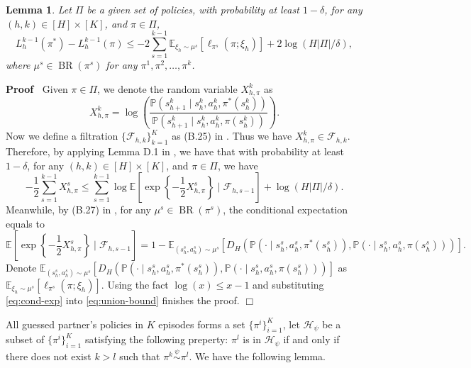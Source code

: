 \documentclass{article}
\newcommand{\tmop}[1]{\ensuremath{\operatorname{#1}}}
\newenvironment{proof}{\noindent\textbf{Proof\ }}{\hspace*{\fill}$\Box$\medskip}
\newtheorem{lemma}{Lemma}
\begin{document}
\begin{lemma}
  \label{lem:loss-upperbound}Let $\Pi$ be a given set of policies, with
  probability at least $1 - \delta$, for any $(h, k) \in [H] \times [K]$, and
  $\pi \in \Pi$,
  \[ L_h^{k - 1} (\pi^{\ast}) - L_h^{k - 1} (\pi) \leq - 2 \sum_{s = 1}^{k -
     1} \mathbb{E}_{\xi_h \sim \mu^s} [\ell_{\pi^s} (\pi ; \xi_h)] + 2 \log (H
     | \Pi | / \delta), \]
  where $\mu^s \in \tmop{BR} (\pi^s)$ for any $\pi^1, \pi^2, \ldots, \pi^k$.
\end{lemma}

\begin{proof}
  Given $\pi \in \Pi$, we denote the random variable $X^k_{h, \pi}$ as
  \[ X^k_{h, \pi} = \log \left( \frac{\mathbb{P}  (s_{h + 1}^k \mid s_h^k,
     a_h^k, \pi^{\ast} (s^k_h))}{\mathbb{P} (s_{h + 1}^k \mid s_h^k, a_h^k,
     \pi (s^k_h))} \right) . \]
  Now we define a filtration $\{ \mathcal{F}_{h, k} \}_{k = 1}^K$ as (B.25) in
  {\cite{liu_one_2023}}. Thus we have $X_{h, \pi}^k \in \mathcal{F}_{h, k}$.
  Therefore, by applying Lemma D.1 in {\cite{liu_one_2023}}, we have that with
  probability at least $1 - \delta$, for any $(h, k) \in [H] \times [K]$, and
  $\pi \in \Pi$, we have
  \begin{equation}
    - \frac{1}{2} \sum_{s = 1}^{k - 1} X_{h, \pi}^s \leq \sum_{s = 1}^{k - 1}
    \log \mathbb{E} \left[ \exp \left\{ - \frac{1}{2} X_{h, \pi}^s \right\}
    \mid \mathcal{F}_{h, s - 1} \right] + \log (H | \Pi | / \delta) .
    \label{eq:union-bound}
  \end{equation}
  Meanwhile, by (B.27) in {\cite{liu_one_2023}}, for any $\mu^s \in \tmop{BR}
  (\pi^s)$, the conditional expectation equals to
  \begin{equation}
    \mathbb{E} \left[ \exp \left\{ - \frac{1}{2} X_{h, \pi}^s \right\} \mid
    \mathcal{F}_{h, s - 1} \right] = 1 -\mathbb{E}_{(s_h^s, a_h^s) \sim \mu^s}
    [D_H (\mathbb{P} (\cdot \mid s_h^s, a_h^s, \pi^{\ast} (s_h^s)), \mathbb{P}
    (\cdot \mid s_h^s, a_h^s, \pi (s^s_h)))] . \label{eq:cond-exp}
  \end{equation}
  Denote $\mathbb{E}_{(s_h^s, a_h^s) \sim \mu^s} [D_H (\mathbb{P} (\cdot \mid
  s_h^s, a_h^s, \pi^{\ast} (s_h^s)), \mathbb{P} (\cdot \mid s_h^s, a_h^s, \pi
  (s^s_h)))]$ as $\mathbb{E}_{\xi_h \sim \mu^s} [\ell_{\pi^s} (\pi ; \xi_h)]$.
  Using the fact $\log (x) \leq x - 1$ and substituting \eqref{eq:cond-exp}
  into \eqref{eq:union-bound} finishes the proof.
\end{proof}

All guessed partner's policies in $K$ episodes forms a set $\{ \pi^i \}_{i =
1}^K$, let $\mathcal{H}_{\psi}$ be a subset of $\{ \pi^i \}_{i = 1}^K$
satisfying the following preperty: $\pi^l$ is in $\mathcal{H}_{\psi}$ if and
only if there does not exist $k > l$ such that $\pi^k \overset{\psi}{\sim}
\pi^l$. We have the following lemma.
\end{document}
